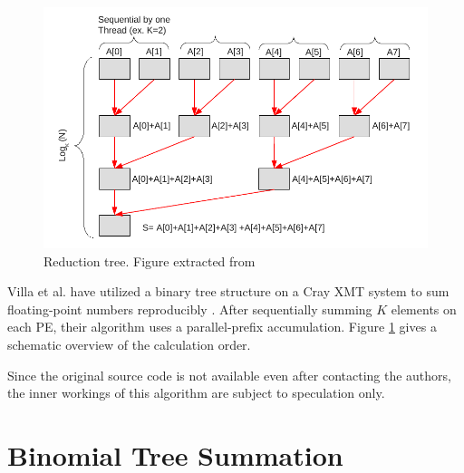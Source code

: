 \begin{figure}
\centering
\includegraphics[scale=0.7]{figures/villa_et_al_reduction_tree.pdf}
\caption{Reduction tree. Figure extracted from \cite{villa_effects_2009}}
\label{fig:villa_reduction_tree}
\end{figure}


Villa et al. have utilized a binary tree structure on a Cray XMT system to sum floating-point numbers reproducibly \cite{villa_effects_2009}.
After sequentially summing $K$ elements on each PE, their algorithm uses a parallel-prefix accumulation.
Figure \ref{fig:villa_reduction_tree} gives a schematic overview of the calculation order.

Since the original source code is not available even after contacting the authors, the inner workings of this algorithm are subject to speculation only.

\chapter{Binomial Tree Summation}
\label{ch:BinomialTreeSummation}

